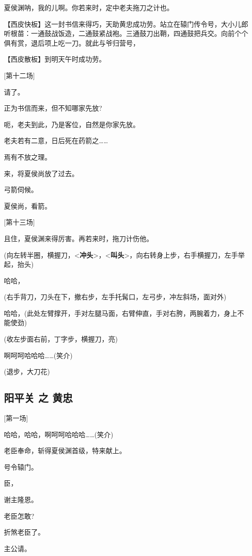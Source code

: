 夏侯渊呐，我的儿啊。你若来时，定中老夫拖刀之计也。

【西皮快板】这一封书信来得巧，天助黄忠成功劳。站立在辕门传令号，大小儿郎听根苗：一通鼓战饭造，二通鼓紧战袍。三通鼓刀出鞘，四通鼓把兵交。向前个个俱有赏，退后项上吃一刀。就此与爷归营号，

【西皮散板】到明天午时成功劳。

{[}第十二场{]}

请了。

正为书信而来，但不知哪家先放?

呃，老夫到此，乃是客位，自然是你家先放。

老夫若有二意，日后死在药箭之\ldots{}\ldots{}

焉有不放之理。

来，将夏侯尚放了过去。

弓箭伺候。

夏侯尚，看箭。

{[}第十三场{]}

且住，夏侯渊来得厉害。再若来时，拖刀计伤他。

(向左转半圈，横握刀，\textless{}\textbf{冲头}\textgreater{}，\textless{}\textbf{叫头}\textgreater{}，向右转身上步，右手横握刀，左手举起，抬头)

哈哈，

(右手背刀，刀头在下，撤右步，左手托髯口，左弓步，冲左斜场，面对外)

哈哈，(此处左臂撑开，手对左腿马面，右臂伸直，手对右胯，两腕着力，身上不能使劲)

(收左步面右前，丁字步，横握刀，亮)

啊呵呵哈哈哈\ldots{}\ldots{}(笑介)

(退步，大刀花)

\hypertarget{ux9633ux5e73ux5173-ux4e4b-ux9ec4ux5fe0}{%
\subsection{阳平关 之
黄忠}\label{ux9633ux5e73ux5173-ux4e4b-ux9ec4ux5fe0}}

{[}第一场{]}

哈哈，哈哈，啊呵呵哈哈哈\ldots{}\ldots{}(笑介)

老臣奉命，斩得夏侯渊首级，特来献上。

号令辕门。

臣，

谢主隆恩。

老臣怎敢?

折煞老臣了。

主公请。

